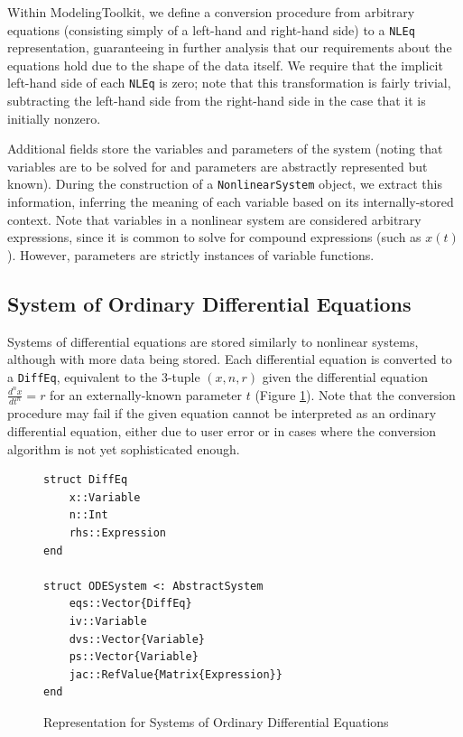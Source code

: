 \documentclass{juliacon}
\begin{document}
Within ModelingToolkit, we define a conversion procedure from arbitrary equations (consisting simply of a left-hand and right-hand side) to a \texttt{NLEq} representation, guaranteeing in further analysis that our requirements about the equations hold due to the shape of the data itself. We require that the implicit left-hand side of each \texttt{NLEq} is zero; note that this transformation is fairly trivial, subtracting the left-hand side from the right-hand side in the case that it is initially nonzero.

Additional fields store the variables and parameters of the system (noting that variables are to be solved for and parameters are abstractly represented but known). During the construction of a \texttt{NonlinearSystem} object, we extract this information, inferring the meaning of each variable based on its internally-stored context. Note that variables in a nonlinear system are considered arbitrary expressions, since it is common to solve for compound expressions (such as $x(t)$). However, parameters are strictly instances of variable functions.


\subsection{System of Ordinary Differential Equations}

Systems of differential equations are stored similarly to nonlinear systems, although with more data being stored. Each differential equation is converted to a \texttt{DiffEq}, equivalent to the 3-tuple $(x,n,r)$ given the differential equation $\frac{d^nx}{dt^n} = r$ for an externally-known parameter $t$ (Figure \ref{code:diffeq}). Note that the conversion procedure may fail if the given equation cannot be interpreted as an ordinary differential equation, either due to user error or in cases where the conversion algorithm is not yet sophisticated enough.

\begin{figure}[tbh!]
\begin{lstlisting}
struct DiffEq
    x::Variable
    n::Int
    rhs::Expression
end

struct ODESystem <: AbstractSystem
    eqs::Vector{DiffEq}
    iv::Variable
    dvs::Vector{Variable}
    ps::Vector{Variable}
    jac::RefValue{Matrix{Expression}}
end
\end{lstlisting}
\caption{Representation for Systems of Ordinary Differential Equations}
\label{code:diffeq}
\end{figure}
\end{document}
